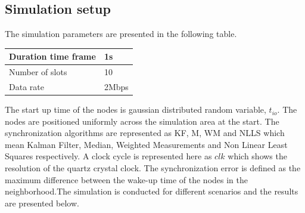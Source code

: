 \documentclass[journal]{IEEEtran}
\begin{document}
\subsection{\textbf{Simulation setup}}
The simulation parameters are presented in the following table.
\begin{center}
    \begin{tabular}{ | l | l |}
    \hline
    Duration time frame & 1s \\ \hline
    Number of slots &  10 \\ \hline
    Data rate &  2Mbps \\ \hline
    \end{tabular}
\end{center}
The start up time of the nodes is gaussian distributed random
variable, $t_{io}$. The nodes are positioned uniformly across the
simulation area at the start. The synchronization algorithms are
represented as KF, M, WM and NLLS which mean Kalman Filter, Median,
Weighted Measurements and Non Linear Least Squares respectively. A
clock cycle is represented here as $clk$ which shows the resolution
of the quartz crystal clock. The synchronization error is defined as
the maximum difference between the wake-up time of the nodes in the
neighborhood.The simulation is conducted for different scenarios and
the results are presented below.
\end{document}
